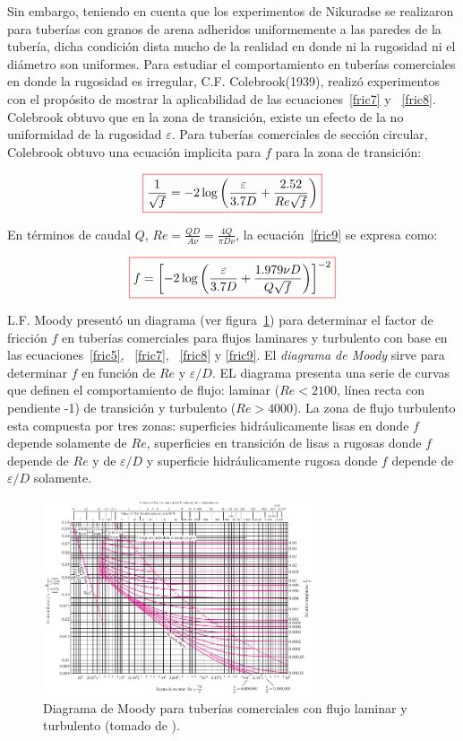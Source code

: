 \documentclass[11pt, oneside]{article}
\begin{document}
Sin embargo, teniendo en cuenta que los experimentos de Nikuradse se realizaron para tuber\'ias con granos de arena adheridos uniformemente a las paredes de la tuber\'ia, dicha condici\'on dista mucho de la realidad en donde ni la rugosidad ni el di\'ametro son uniformes. Para estudiar el comportamiento en tuber\'ias comerciales en donde la rugosidad es irregular, C.F. Colebrook(1939), realiz\'o experimentos con el prop\'osito de mostrar la aplicabilidad de las ecuaciones~\ref{fric7} y ~\ref{fric8}. Colebrook obtuvo que en la zona de transici\'on, existe un efecto de la no uniformidad de la rugosidad $\varepsilon$. Para tuber\'ias comerciales de secci\'on circular, Colebrook obtuvo una ecuaci\'on implicita para $f$ para la zona de transici\'on:

\begin{equation}
\color{red}\boxed{\color{black} \frac{1}{\sqrt{f}}= -2 \log \left( \frac{\varepsilon}{3.7D} + \frac{2.52}{Re \sqrt{f}} \right) }
\label{fric9}
\end{equation}

En t\'erminos de caudal $Q$, $Re = \frac{QD}{A \nu} = \frac{4Q}{\pi D \nu}$, la ecuaci\'on~\ref{fric9} se expresa como:

\begin{equation}
\color{red}\boxed{\color{black} f  = \left[ -2 \log \left( \frac{\varepsilon}{3.7D} + \frac{1.979 \nu D}{Q \sqrt{f}} \right) \right]^{-2} }
\label{fric10}
\end{equation}

L.F. Moody present\'o un diagrama (ver figura~\ref{mood}) para determinar el factor de fricci\'on $f$ en tuber\'ias comerciales para flujos laminares y turbulento con base en las ecuaciones~\ref{fric5}, ~\ref{fric7}, ~\ref{fric8} y \ref{fric9}. El \emph{diagrama de Moody} sirve para determinar $f$ en funci\'on de $Re$ y $\varepsilon/D$. EL diagrama presenta una serie de curvas que definen el comportamiento de flujo: laminar ($Re<2100$, l\'inea recta con pendiente -1) de transici\'on y turbulento ($Re>4000$).  La zona de flujo turbulento esta compuesta por tres zonas: superficies hidr\'aulicamente lisas en donde $f$ depende solamente de $Re$, superficies en transici\'on de lisas a rugosas donde $f$ depende de $Re$ y de $\varepsilon/D$ y superficie hidr\'aulicamente rugosa donde $f$ depende de $\varepsilon/D$ solamente. 

\begin{figure}[h]
\centering
\includegraphics[width=8cm]{mood.png}
\caption{Diagrama de Moody para tuber\'ias comerciales con flujo laminar y turbulento (tomado de \cite{white1990fluid}).}
\label{mood}
\end{figure}
\end{document}
